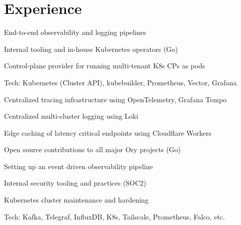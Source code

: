 \documentclass[]{config}
\begin{document}
\begin{minipage}[t]{0.66\textwidth} 


\section{Experience}

\vspace{\topsep} %
\vspace{\topsep} %
\vspace{\topsep} %
\begin{tightemize}
\item End-to-end observability and logging pipelines
\item Internal tooling and in-house Kubernetes operators (Go)
\item Control-plane provider for running multi-tenant K8s CPs as pods
\item Tech: Kubernetes (Cluster API), kubebuilder, Prometheus, Vector, Grafana
\end{tightemize}
\sectionsep


\vspace{\topsep} %
\begin{tightemize}
\item Centralized tracing infrastructure using OpenTelemetry, Grafana Tempo
\item Centralized multi-cluster logging using Loki
\item Edge caching of latency critical endpoints using Cloudflare Workers
\item Open source contributions to all major Ory projects (Go)
\end{tightemize}
\sectionsep


\vspace{\topsep} %
\begin{tightemize}
\item Setting up an event driven observability pipeline
\item Internal security tooling and practices (SOC2)
\item Kubernetes cluster maintenance and hardening
\item Tech: Kafka, Telegraf, InfluxDB, K8s, Tailscale, Prometheus, Falco, etc.
\end{tightemize}
\sectionsep



\end{minipage}
\end{document}
